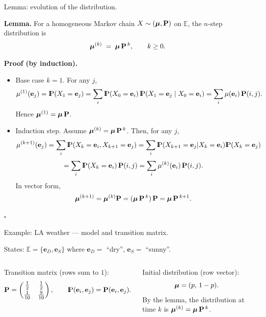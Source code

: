 \documentclass[aspectratio=169]{beamer}
\newcommand{\Prob}{{\rm I\hspace{-0.8mm}P}}
\newcommand{\e}[0]{\textbf{e}}
\newcommand{\E}[0]{\mathbb{E}}
\begin{document}
\begin{frame}{Lemma: evolution of the distribution.}

\textbf{Lemma.} For a homogeneous Markov chain \(X \sim (\mbox{\boldmath $\mu$},\mathbf{P})\) on \(\E\),
the \(n\)-step distribution is
\[
\mbox{\boldmath $\mu$}^{(k)} \;=\; \mbox{\boldmath $\mu$}\,\mathbf{P}^{\,k}, \qquad k\ge 0.
\]

\textbf{Proof (by induction).}
\begin{itemize}
\item Base case \(k=1\).
For any \(j\),
\[
\mu^{(1)}(\e_j)=\Prob(X_1=\e_j)
=\sum_{i}\Prob(X_0=\e_i)\,\Prob(X_1=\e_j\mid X_0=\e_i)
=\sum_{i}\mu(\e_i)\,\bfP(i,j).
\]
Hence \(\mbox{\boldmath $\mu$}^{(1)}=\mbox{\boldmath $\mu$}\,\mathbf{P}\).
\pause
\item Induction step.
Assume \(\mbox{\boldmath $\mu$}^{(k)}=\mbox{\boldmath $\mu$}\,\mathbf{P}^{\,k}\).
Then, for any \(j\),
$$
\mu^{(k+1)}(\e_j)=\sum_{i}\Prob(X_k=\e_i, X_{k+1}=\e_j)
=\sum_{i}\Prob(X_{k+1}=\e_j| X_k=\e_i)\Prob(X_k=\e_j)$$
$$=\sum_{i}\Prob(X_k=\e_i)\,\bfP(i,j)
=\sum_{i}\mu^{(k)}(\e_i)\,\bfP(i,j).$$
In vector form,
\[
\mbox{\boldmath $\mu$}^{(k+1)}=\mbox{\boldmath $\mu$}^{(k)}\mathbf{P}
=(\mbox{\boldmath $\mu$}\,\mathbf{P}^{\,k})\,\mathbf{P}
=\mbox{\boldmath $\mu$}\,\mathbf{P}^{\,k+1}.
\]
\end{itemize}
\hfill\(\square\)

\end{frame}



\begin{frame}{Example: LA weather — model and transition matrix.}

States: \(\E=\{\e_D,\e_S\}\) where \(\e_D=\) ``dry'', \(\e_S=\) ``sunny''.

\medskip
\begin{columns}[T,onlytextwidth]
\centering
{}

Transition matrix (rows sum to \(1\)):
\[
\bfP=\begin{pmatrix}
\frac12 & \frac12\\[2pt]
\frac1{10} & \frac9{10}
\end{pmatrix},
\qquad
\Prob(\e_i,\e_j)=\bfP(\e_i,\e_j).
\]

Initial distribution (row vector):
\[
\mbox{\boldmath $\mu$}=(p,\,1-p).
\]
By the lemma, the distribution at time \(k\) is \(\mbox{\boldmath $\mu$}^{(k)}=\mbox{\boldmath $\mu$}\,\mathbf{P}^{\,k}\).
\end{columns}

\end{frame}
\end{document}
